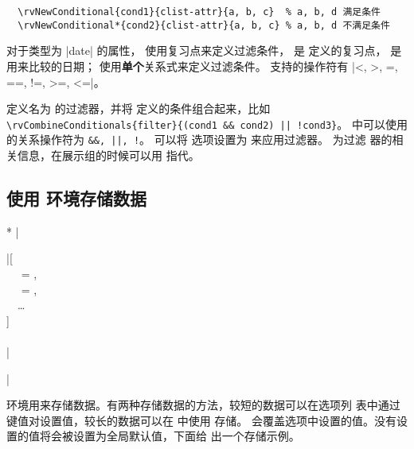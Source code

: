 \documentclass[full]{l3doc}
\begin{document}
\begin{documentation}
\begin{verbatim}
  \rvNewConditional{cond1}{clist-attr}{a, b, c}  % a, b, d 满足条件
  \rvNewConditional*{cond2}{clist-attr}{a, b, c} % a, b, d 不满足条件
\end{verbatim}

  对于类型为 |date| 的属性， 使用复习点来定义过滤条件，
   是  定义的复习点， 是
  用来比较的日期； 使用\textbf{单个}关系式来定义过滤条件。
  支持的操作符有 |<, >, =, ==, !=, >=, <=|。

\begin{function}{\rvCombineConditionals}
  \begin{syntax}
       
  \end{syntax}

   定义名为  的过滤器，并将
   定义的条件组合起来，比如
  \verb=\rvCombineConditionals{filter}{(cond1 && cond2) || !cond3}=。
   中可以使用的关系操作符为 \verb=&&, ||, !=。
  可以将  选项设置为  来应用过滤器。 为过滤
  器的相关信息，在展示组的时候可以用  指代。
\end{function}

\subsection{使用  环境存储数据}

\noindent{}
\begin{Syntax}*
  |\begin{rvitem}|[ \\
  ~~ = , \\
  ~~ = , \\
  ~~\ldots{} \\
  ] \\
  ~~ \\
  |\end{rvitem}|
\end{Syntax}

   环境用来存储数据。有两种存储数据的方法，较短的数据可以在选项列
  表中通过键值对设置值，较长的数据可以在  中使用  存储。
  会覆盖选项中设置的值。没有设置的值将会被设置为全局默认值，下面给
  出一个存储示例。


\end{documentation}
\end{document}
